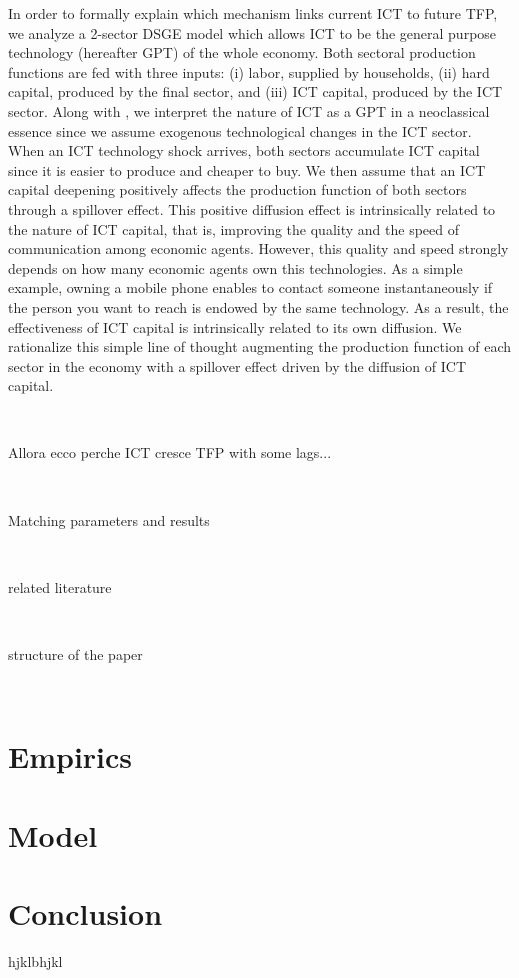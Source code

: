 \documentclass[14pt]{article}
\begin{document}
In order to formally explain which mechanism links current ICT to future TFP, we analyze a 2-sector DSGE model which allows ICT to be the general purpose technology (hereafter GPT) of the whole economy. Both sectoral production functions are fed with three inputs: (i) labor, supplied by households, (ii) hard capital, produced by the final sector, and (iii) ICT capital, produced by the ICT sector. Along with \cite{basu2007information}, we interpret the nature of ICT as a GPT in a neoclassical essence since we assume exogenous technological changes in the ICT sector. When an ICT technology shock arrives, both sectors accumulate ICT capital since it is easier to produce and cheaper to buy. We then assume that an ICT capital deepening positively affects the production function of both sectors through a spillover effect. This positive diffusion effect is intrinsically related to the nature of ICT capital, that is, improving the quality and the speed of communication among economic agents. However, this quality and speed strongly depends on how many economic agents own this technologies. As a simple example, owning a mobile phone enables to contact someone instantaneously if the person you want to reach is endowed by the same technology. As a result, the effectiveness of ICT capital is intrinsically related to its own diffusion. We rationalize this simple line of thought augmenting the production function of each sector in the economy with a spillover effect driven by the diffusion of ICT capital.

\ 

Allora ecco perche ICT cresce TFP with some lags...	

\

Matching parameters and results

\

related literature

\

structure of the paper

\







\section{Empirics}



\section{Model}




\section{Conclusion}
hjklbhjkl







 
\end{document}
